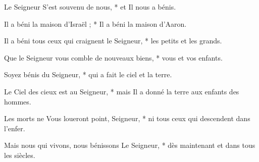 \item Le Seigneur S'est souvenu de nous, * et Il nous a bénis.
\item Il a béni la maison d'Israël ; * Il a béni la maison d'Aaron.
\item Il a béni tous ceux qui craignent le Seigneur, * les petits et les grands.
\item Que le Seigneur vous comble de nouveaux biens, * vous et vos enfants.
\item Soyez bénis du Seigneur, * qui a fait le ciel et la terre.
\item Le Ciel des cieux est au Seigneur, * mais Il a donné la terre aux enfants des hommes.
\item Les morts ne Vous loueront point, Seigneur, * ni tous ceux qui descendent dans l'enfer.
\item Mais nous qui vivons, nous bénissons Le Seigneur, * dès maintenant et dans tous les siècles.